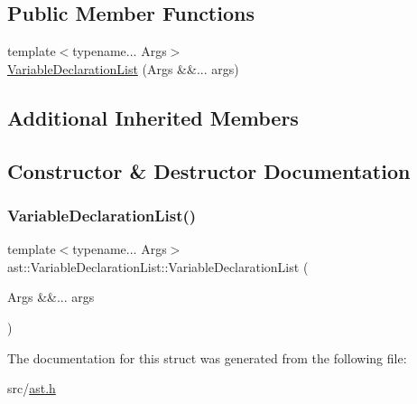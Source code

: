 \subsection*{Public Member Functions}
\begin{DoxyCompactItemize}
\item 
{\footnotesize template$<$typename... Args$>$ }\\\hyperlink{structast_1_1_variable_declaration_list_a25a5ee2fa3cc7cf1f92659841005bd16}{Variable\+Declaration\+List} (Args \&\&... args)
\end{DoxyCompactItemize}
\subsection*{Additional Inherited Members}


\subsection{Constructor \& Destructor Documentation}
\mbox{\label{structast_1_1_variable_declaration_list_a25a5ee2fa3cc7cf1f92659841005bd16}} 
\subsubsection{\texorpdfstring{Variable\+Declaration\+List()}{VariableDeclarationList()}}
{\footnotesize\ttfamily template$<$typename... Args$>$ \\
ast\+::\+Variable\+Declaration\+List\+::\+Variable\+Declaration\+List (\begin{DoxyParamCaption}\item[{Args \&\&...}]{args }\end{DoxyParamCaption})\hspace{0.3cm}{\ttfamily [inline]}}



The documentation for this struct was generated from the following file\+:\begin{DoxyCompactItemize}
\item 
src/\hyperlink{ast_8h}{ast.\+h}\end{DoxyCompactItemize}

